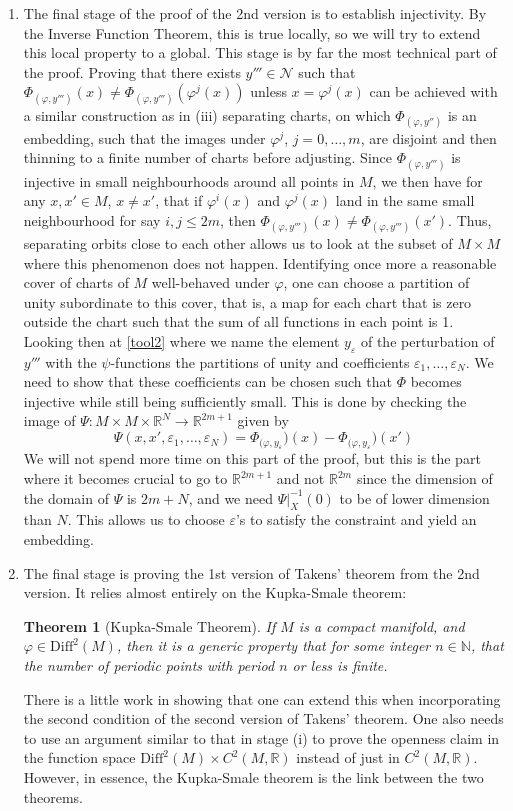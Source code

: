 \documentclass[11pt, a4paper]{memoir}
\theoremstyle{break}
\newtheorem{thm}{Theorem}
\theoremstyle{break}
\theoremstyle{nonumberplain}
\newcommand{\mN}{\mathbb{N}}
\newcommand{\mR}{\mathbb{R}}
\begin{document}
\begin{enumerate}[label=(\roman*)]
	\item The final stage of the proof of the 2nd version is to establish injectivity. By the Inverse Function Theorem, this is true locally, so we will try to extend this local property to a global. This stage is by far the most technical part of the proof. Proving that there exists $y'''\in \mathcal{N}$ such that $\Phi_{(\varphi, y''')}(x)\neq \Phi_{(\varphi, y''')}(\varphi^j(x))$ unless $x=\varphi^j(x)$ can be achieved with a similar construction as in (iii) separating charts, on which $\Phi_{(\varphi,y'')}$ is an embedding, such that the images under $\varphi^j$, $j=0,\ldots,m$, are disjoint and then thinning to a finite number of charts before adjusting. Since $\Phi_{(\varphi,y''')}$ is injective in small neighbourhoods around all points in $M$, we then have for any $x,x'\in M$, $x\neq x'$, that if $\varphi^i(x)$ and $\varphi^j(x)$ land in the same small neighbourhood for say $i,j\leqslant 2m$, then $\Phi_{(\varphi,y''')}(x)\neq \Phi _{(\varphi,y''')}(x')$. Thus, separating orbits close to each other allows us to look at the subset of $M\times M$ where this phenomenon does not happen. Identifying once more a reasonable cover of charts of $M$ well-behaved under $\varphi$, one can choose a partition of unity subordinate to this cover, that is, a map for each chart that is zero outside the chart such that the sum of all functions in each point is 1. Looking then at \ref{tool2} where we name the element $y_{\varepsilon}$ of the perturbation of $y'''$ with the $\psi$-functions the partitions of unity and coefficients $\varepsilon_1,\ldots,\varepsilon_N$. We need to show that these coefficients can be chosen such that $\Phi$ becomes injective while still being sufficiently small. This is done by checking the image of $\Psi:M\times M\times \mR^N\to\mR^{2m+1}$ given by
	$$\Psi(x,x',\varepsilon_1,\ldots,\varepsilon_N)=\Phi_{(\varphi,y_{\varepsilon}})(x)-\Phi_{(\varphi,y_{\varepsilon}})(x')$$
	We will not spend more time on this part of the proof, but this is the part where it becomes crucial to go to $\mR^{2m+1}$ and not $\mR^{2m}$ since the dimension of the domain of $\Psi$ is $2m+N$, and we need $\Psi|_{X}^{-1}(0)$ to be of lower dimension than $N$. This allows us to choose $\varepsilon$'s to satisfy the constraint and yield an embedding. 
	\item The final stage is proving the 1st version of Takens' theorem from the 2nd version. It relies almost entirely on the Kupka-Smale theorem:
	\begin{thm}[Kupka-Smale Theorem]
	If $M$ is a compact manifold, and $\varphi\in \text{Diff}^2(M)$, then it is a generic property that for some integer $n\in \mN$, that the number of periodic points with period $n$ or less is finite.
	\end{thm}
	There is a little work in showing that one can extend this when incorporating the second condition of the second version of Takens' theorem. One also needs to use an argument similar to that in stage (i) to prove the openness claim in the function space $\text{Diff}^2(M)\times C^2(M,\mR)$ instead of just in $C^2(M,\mR)$. However, in essence, the Kupka-Smale theorem is the link between the two theorems.
\end{enumerate}  
\end{document}
